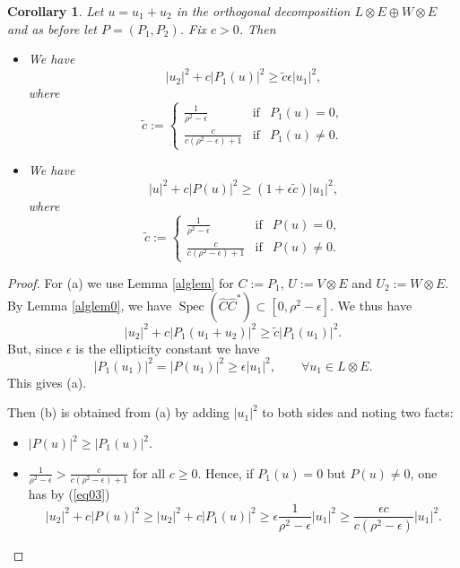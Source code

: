 \documentclass[12pt]{amsart} %
\newtheorem{corollary}[theorem]{Corollary}
\theoremstyle{definition}
\numberwithin{equation}{section}
\DeclareMathOperator{\Spec}{Spec}
\begin{document}
\begin{corollary}\label{cord} Let $u=u_1+u_2$ in the orthogonal decomposition $L\otimes E\oplus W\otimes E$ and as before let $P=(P_1,P_2)$. Fix $c>0$.  Then
\begin{itemize}\item[(a)] We have \begin{equation}\label{eq03}|u_2|^ 2+c|P_1(u)|^ 2\geq \tilde{c}\epsilon|u_1|^ 2, \end{equation}
where 
\[\tilde{c}:=\left\{\begin{array}{ccc} \frac{1}{\rho^ 2-\epsilon}&\mbox{if} & P_1(u)=0 , \\
  \frac{c}{c(\rho^ 2-\epsilon)+1}& \mbox{if}&P_1(u)\neq 0 . \end{array}\right.\]
 \item[(b)] We have \[|u|^ 2+c|P(u)|^ 2\geq (1+\epsilon \tilde{c})|u_1|^ 2 ,\]
where 
\[\tilde{c}:=\left\{\begin{array}{ccc} \frac{1}{\rho^ 2-\epsilon}&\mbox{if} & P(u)=0 , \\
  \frac{c}{c(\rho^ 2-\epsilon)+1}& \mbox{if}& P(u)\neq 0 . \end{array}\right.\]
\end{itemize}

\end{corollary}
\begin{proof} For (a) we use  Lemma  \ref{alglem}  for $C:=P_1$, $U:=V\otimes E$ and $U_2:=W\otimes E$. By Lemma \ref{alglem0}, we have $\Spec(\hat{C}\hat{C}^ *)\subset [0,\rho^ 2-\epsilon]$. We thus have 
\[|u_2|^ 2+c|P_1(u_1+u_2)|^ 2\geq \tilde{c}|P_1(u_1)|^ 2.\]
But, since $\epsilon$ is the ellipticity constant we have
\[|P_1(u_1)|^ 2=|P(u_1)|^2\geq\epsilon |u_1|^ 2,\qquad\forall u_1\in L\otimes E. \]
This gives (a).

Then (b) is obtained from (a) by adding $|u_1|^ 2$ to both sides and noting two facts:
\begin{itemize}
\item[(1)] $|P(u)|^2\geq |P_1(u)|^ 2$. 
\item[(2)] $\frac{1}{\rho^ 2-\epsilon}> \frac{c}{c(\rho^ 2-\epsilon)+1}$ for all $c\geq 0$. Hence, if $P_1(u)=0$ but $P(u)\neq 0$,  one has by (\ref{eq03})
\[|u_2|^ 2+c|P(u)|^2\geq |u_2|^ 2+c|P_1(u)|^ 2\geq \epsilon \frac{1}{\rho^ 2-\epsilon} |u_1|^ 2\geq \frac{\epsilon c}{c(\rho^ 2-\epsilon)}|u_1|^ 2.\]
\end{itemize}
\end{proof}
\end{document}
